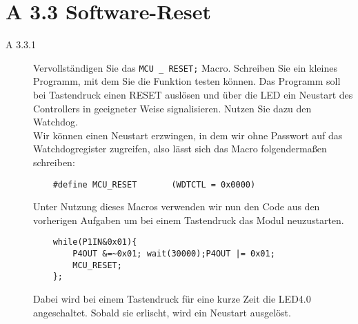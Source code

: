 \documentclass[11pt,a4paper,ngerman]{article}
\begin{document}
\newpage
\section*{A 3.3 Software-Reset} 

\begin{description}
	\item[A 3.3.1] Vervollständigen Sie das \texttt{MCU \_ RESET;} Macro. Schreiben Sie ein kleines Programm, mit dem Sie die Funktion testen können. Das Programm soll bei Tastendruck einen RESET auslösen und über die LED ein Neustart des Controllers in geeigneter Weise signalisieren. Nutzen Sie dazu den Watchdog. \\
	
	Wir können einen Neustart erzwingen, in dem wir ohne Passwort auf das Watchdogregister zugreifen, also lässt sich das Macro folgendermaßen schreiben:
	\begin{lstlisting}
	#define MCU_RESET 		(WDTCTL = 0x0000)
	\end{lstlisting}
	
	Unter Nutzung dieses Macros verwenden wir nun den Code aus den vorherigen Aufgaben um bei einem Tastendruck das Modul neuzustarten.
	\begin{lstlisting}
	while(P1IN&0x01){
		P4OUT &=~0x01; wait(30000);P4OUT |= 0x01;
		MCU_RESET;
	};
	\end{lstlisting}
	Dabei wird bei einem Tastendruck für eine kurze Zeit die LED4.0 angeschaltet. Sobald sie erlischt, wird ein Neustart ausgelöst.
	
\end{description}
\label{LastPage}
\end{document}
